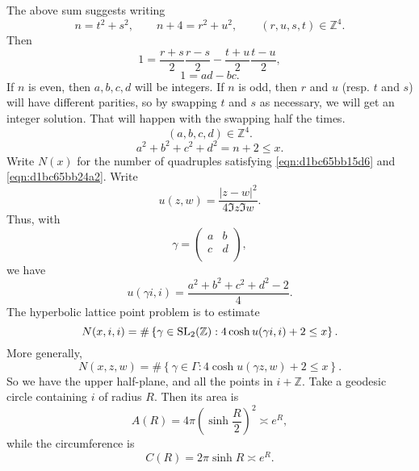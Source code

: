 \documentclass[reqno]{amsart} 
\begin{document}
The above sum suggests writing
\begin{equation*}
  n = t^2 + s^2, \qquad n + 4 = r^2 + u^2 , \qquad
  (r, u, s, t ) \in \mathbb{Z}^4.
\end{equation*}
Then
\begin{equation*}
  1 = \frac{r + s }{2} \frac{r - s }{2} - \frac{t + u}{2} \frac{t - u}{2},
\end{equation*}
\begin{equation}\label{eqn:d1bc65bb15d6}
  1 = a d - b c.
\end{equation}
If $n$ is even, then $a,b,c,d$ will be integers.  If $n$ is odd, then $r$ and $u$ (resp. $t$ and $s$) will have different parities, so by swapping $t$ and $s$ as necessary, we will get an integer solution.  That will happen with the swapping half the times.
\begin{equation*}
  (a , b, c, d) \in \mathbb{Z}^4.
\end{equation*}
\begin{equation}\label{eqn:d1bc65bb24a2}
  a^2 + b^2 + c^2 + d^2 = n + 2 \leq x.
\end{equation}
Write $N (x)$ for the number of quadruples satisfying \eqref{eqn:d1bc65bb15d6} and \eqref{eqn:d1bc65bb24a2}.  Write
\begin{equation*}
  u (z, w ) = \frac{\lvert z - w  \rvert^2 }{ 4 \Im z \Im w}.
\end{equation*}
Thus, with
\begin{equation*}
  \gamma =
  \begin{pmatrix}
    a & b \\
    c & d \\
  \end{pmatrix},
\end{equation*}
we have
\begin{equation*}
  u (\gamma i, i) = \frac{a^2 + b^2 + c^2 + d^2 - 2}{4}.
\end{equation*}
The hyperbolic lattice point problem is to estimate
\begin{equation*}
  N (x, i, i) = \# \left\{ \gamma \in \operatorname{SL}_2 (\mathbb{Z} ) : 4 \cosh u (\gamma i, i) + 2 \leq x \right\}.
\end{equation*}
More generally,
\begin{equation*}
  N (x, z, w ) = \# \left\{ \gamma \in \Gamma : 4 \cosh u (\gamma z, w) + 2 \leq x \right\}.
\end{equation*}
So we have the upper half-plane, and all the points in $i + \mathbb{Z}$.  Take a geodesic circle containing $i$ of radius $R$.  Then its area is
\begin{equation*}
  A(R) = 4 \pi \left( \sinh \frac{R}{2} \right)^2 \asymp e^R,
\end{equation*}
while the circumference is
\begin{equation*}
  C(R) = 2 \pi \sinh R \asymp e^R.
\end{equation*}
\end{document}
